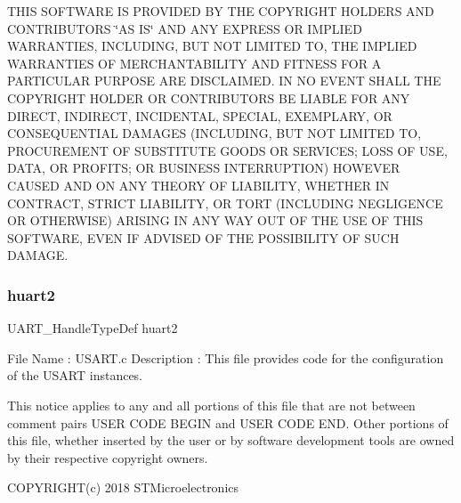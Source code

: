 T\+H\+IS S\+O\+F\+T\+W\+A\+RE IS P\+R\+O\+V\+I\+D\+ED BY T\+HE C\+O\+P\+Y\+R\+I\+G\+HT H\+O\+L\+D\+E\+RS A\+ND C\+O\+N\+T\+R\+I\+B\+U\+T\+O\+RS \char`\"{}\+A\+S I\+S\char`\"{} A\+ND A\+NY E\+X\+P\+R\+E\+SS OR I\+M\+P\+L\+I\+ED W\+A\+R\+R\+A\+N\+T\+I\+ES, I\+N\+C\+L\+U\+D\+I\+NG, B\+UT N\+OT L\+I\+M\+I\+T\+ED TO, T\+HE I\+M\+P\+L\+I\+ED W\+A\+R\+R\+A\+N\+T\+I\+ES OF M\+E\+R\+C\+H\+A\+N\+T\+A\+B\+I\+L\+I\+TY A\+ND F\+I\+T\+N\+E\+SS F\+OR A P\+A\+R\+T\+I\+C\+U\+L\+AR P\+U\+R\+P\+O\+SE A\+RE D\+I\+S\+C\+L\+A\+I\+M\+ED. IN NO E\+V\+E\+NT S\+H\+A\+LL T\+HE C\+O\+P\+Y\+R\+I\+G\+HT H\+O\+L\+D\+ER OR C\+O\+N\+T\+R\+I\+B\+U\+T\+O\+RS BE L\+I\+A\+B\+LE F\+OR A\+NY D\+I\+R\+E\+CT, I\+N\+D\+I\+R\+E\+CT, I\+N\+C\+I\+D\+E\+N\+T\+AL, S\+P\+E\+C\+I\+AL, E\+X\+E\+M\+P\+L\+A\+RY, OR C\+O\+N\+S\+E\+Q\+U\+E\+N\+T\+I\+AL D\+A\+M\+A\+G\+ES (I\+N\+C\+L\+U\+D\+I\+NG, B\+UT N\+OT L\+I\+M\+I\+T\+ED TO, P\+R\+O\+C\+U\+R\+E\+M\+E\+NT OF S\+U\+B\+S\+T\+I\+T\+U\+TE G\+O\+O\+DS OR S\+E\+R\+V\+I\+C\+ES; L\+O\+SS OF U\+SE, D\+A\+TA, OR P\+R\+O\+F\+I\+TS; OR B\+U\+S\+I\+N\+E\+SS I\+N\+T\+E\+R\+R\+U\+P\+T\+I\+ON) H\+O\+W\+E\+V\+ER C\+A\+U\+S\+ED A\+ND ON A\+NY T\+H\+E\+O\+RY OF L\+I\+A\+B\+I\+L\+I\+TY, W\+H\+E\+T\+H\+ER IN C\+O\+N\+T\+R\+A\+CT, S\+T\+R\+I\+CT L\+I\+A\+B\+I\+L\+I\+TY, OR T\+O\+RT (I\+N\+C\+L\+U\+D\+I\+NG N\+E\+G\+L\+I\+G\+E\+N\+CE OR O\+T\+H\+E\+R\+W\+I\+SE) A\+R\+I\+S\+I\+NG IN A\+NY W\+AY O\+UT OF T\+HE U\+SE OF T\+H\+IS S\+O\+F\+T\+W\+A\+RE, E\+V\+EN IF A\+D\+V\+I\+S\+ED OF T\+HE P\+O\+S\+S\+I\+B\+I\+L\+I\+TY OF S\+U\+CH D\+A\+M\+A\+GE. \mbox{\label{stm32f3xx__it_8c_aa9479c261d65eecedd3d9582f7f0f89c}} 
\subsubsection{huart2}
{\footnotesize\ttfamily U\+A\+R\+T\+\_\+\+Handle\+Type\+Def huart2}

File Name \+: U\+S\+A\+R\+T.\+c Description \+: This file provides code for the configuration of the U\+S\+A\+RT instances.

This notice applies to any and all portions of this file that are not between comment pairs U\+S\+ER C\+O\+DE B\+E\+G\+IN and U\+S\+ER C\+O\+DE E\+ND. Other portions of this file, whether inserted by the user or by software development tools are owned by their respective copyright owners.

C\+O\+P\+Y\+R\+I\+G\+H\+T(c) 2018 S\+T\+Microelectronics

